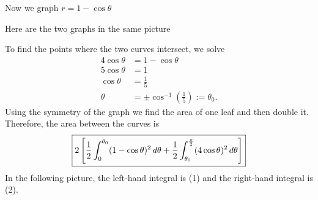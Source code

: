 \documentclass[]{ximera}
\begin{document}
\begin{problem}
\begin{freeResponse}
\begin{enumerate}
	Now we graph $r = 1 - \cos \theta$
		
	Here are the two graphs in the same picture
		
	To find the points where the two curves intersect, we solve
		\begin{align*}
		4 \cos \theta &= 1 - \cos \theta  \\
		5 \cos \theta &= 1  \\
		\cos \theta &= \frac{1}{5}  \\
		\theta &= \pm \cos^{-1} \left( \frac{1}{5} \right) := \theta_0.
		\end{align*}
	Using the symmetry of the graph we find the area of one leaf and then double it.  
	Therefore, the area between the curves is
		\[
		\boxed{ 2 \left[ \frac{1}{2} \int_0^{\theta_0} (1 - \cos \theta)^2 \,d \theta + \frac{1}{2} \int_{\theta_0}^{\frac{\pi}{2}} (4 \cos \theta)^2 \,d \theta \right] }
		\]
	In the following picture, the left-hand integral is (1) and the right-hand integral is (2).
	
	\end{enumerate}
	\end{freeResponse}
		
\end{problem}

\begin{instructorNotes}

\end{instructorNotes}







\begin{comment}
\begin{problem}

	\begin{freeResponse}
	
	\end{freeResponse}

\end{problem}

\begin{instructorNotes}

\end{instructorNotes}
\end{comment}
\end{document}
